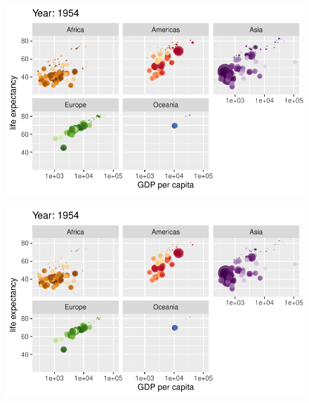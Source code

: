 \documentclass[
  letterpaper,
  DIV=11,
  numbers=noendperiod]{scrartcl}
\begin{document}
\begin{figure}[H]

{\centering \includegraphics{class05_files/figure-pdf/unnamed-chunk-24-4.pdf}

}

\end{figure}

\begin{figure}[H]

{\centering \includegraphics{class05_files/figure-pdf/unnamed-chunk-24-5.pdf}

}

\end{figure}
\end{document}
